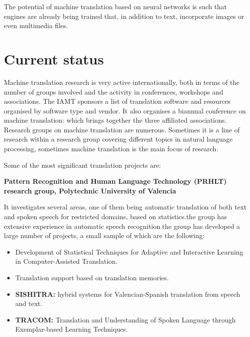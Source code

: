 \documentclass[a4paper]{article}
\theoremstyle{plain}
\theoremstyle{definition}
\begin{document}
    The potential of machine translation based on neural networks is such that engines are already being trained that, in addition to text, incorporate images or even multimedia files.
\newline
\newline
\newline
	\section{Current status}
	Machine translation research is very active internationally, both in terms of the number of groups involved and the activity in conferences, workshops and associations. The IAMT sponsors  a list of translation software and resources organised by software type and vendor. It also organises a biannual conference on machine translation: which brings together the three affiliated associations. Research groups on machine translation are numerous. Sometimes it is a line of research within a research group covering different topics in natural language processing, sometimes machine translation is the main focus of research.
	
	Some of the most significant translation projects are:

   \begin{flushleft}
    \textbf{Pattern Recognition and Human Language Technology (PRHLT) research group, Polytechnic University of Valencia}
   \end{flushleft}
    It investigates several areas, one of them being automatic translation of both text and spoken speech for restricted domains, based on statistics.the group has extensive experience in automatic speech recognition.the group has developed a large number of projects, a small sample of which are the following:
     \begin{itemize}
         \item Development of Statistical Techniques for Adaptive and Interactive Learning in Computer-Assisted Translation.
         \item Translation support based on translation memories.
        \item \textbf{SISHITRA:} hybrid systems for Valencian-Spanish translation from speech and text.
        \item \textbf{TRACOM: }Translation and Understanding of Spoken Language through Exemplar-based Learning Techniques.
    \end{itemize}
   
\end{document}
